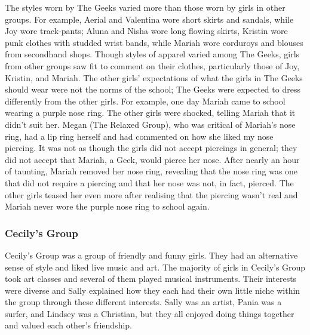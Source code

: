 The styles worn by The Geeks varied more than those worn by girls in other groups. For example, Aerial and Valentina wore short skirts and sandals, while Joy wore track-pants; Aluna and Nisha wore long flowing skirts, Kristin wore punk clothes with studded wrist bands, while Mariah wore corduroys and blouses from secondhand shops. Though styles of apparel varied among The Geeks, girls from other groups saw fit to comment on their clothes, particularly those of Joy, Kristin, and Mariah. The other girls' expectations of what the girls in The Geeks should wear were not the norms of the school; The Geeks were expected to dress differently from the other girls. For example, one day Mariah came to school wearing a purple nose ring. The other girls were shocked, telling Mariah that it didn't suit her. Megan (The Relaxed Group), who was critical of Mariah's nose ring, had a lip ring herself and had commented on how she liked my nose piercing. It was not as though the girls did not accept piercings in general; they did not accept that Mariah, a Geek, would pierce her nose. After nearly an hour of taunting, Mariah removed her nose ring, revealing that the nose ring was one that did not require a piercing and that her nose was not, in fact, pierced. The other girls teased her even more after realising that the piercing wasn't real and Mariah never wore the purple nose ring to school again. 


\subsubsection{Cecily's Group}

Cecily's Group was a group of friendly and funny girls. They had an alternative sense of style and liked live music and art. The majority of girls in Cecily's Group took art classes and several of them played musical instruments. Their interests were diverse and Sally explained how they each had their own little niche within the group through these different interests. Sally was an artist, Pania was a surfer, and Lindsey was a Christian, but they all enjoyed doing things together and valued each other's friendship.


